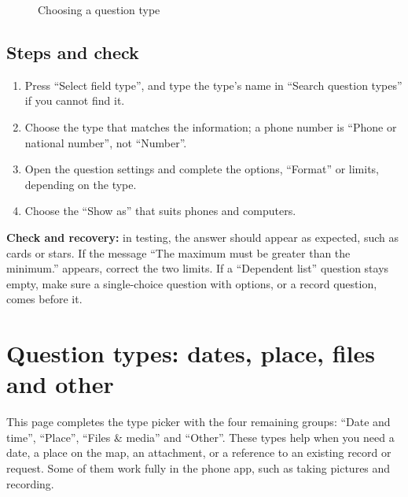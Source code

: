 \begin{figure}[H]
\centering
{}
\rclegend
\caption{Choosing a question type}
\label{fig:builder-forms-questions-basic-flow}
\end{figure}

\subsection{Steps and check}
\begin{enumerate}
\item Press “Select field type”, and type the type's name in “Search question types” if you cannot find it.
\item Choose the type that matches the information; a phone number is “Phone or national number”, not “Number”.
\item Open the question settings and complete the options, “Format” or limits, depending on the type.
\item Choose the “Show as” that suits phones and computers.
\end{enumerate}

\textbf{Check and recovery:} in testing, the answer should appear as expected, such as cards or stars. If the message “The maximum must be greater than the minimum.” appears, correct the two limits. If a “Dependent list” question stays empty, make sure a single-choice question with options, or a record question, comes before it.

\clearpage
\section{Question types: dates, place, files and other}
\label{sec:builder-feature-forms-questions-more}

This page completes the type picker with the four remaining groups: “Date and time”, “Place”, “Files \& media” and “Other”. These types help when you need a date, a place on the map, an attachment, or a reference to an existing record or request. Some of them work fully in the phone app, such as taking pictures and recording.


